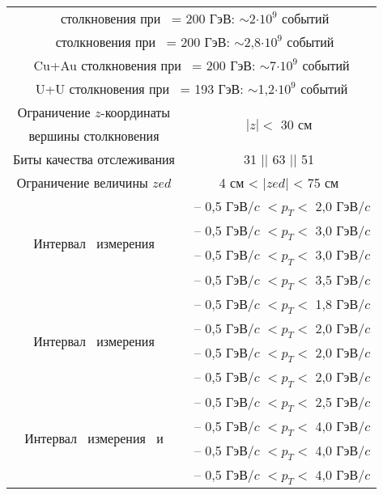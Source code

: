 \begin{table}
{\begin{tabular}{|c|c|}
		\multicolumn{2}{|c|}{\pal \ столкновения при \sqsn \ = 200 ГэВ: $\sim$2$\cdot 10^9$ событий}\\ 
		\multicolumn{2}{|c|}{\heau \ столкновения при \sqsn \ = 200 ГэВ: $\sim$2,8$\cdot 10^9$ событий}\\ 
		\multicolumn{2}{|c|}{Cu+Au столкновения при \sqsn \ = 200 ГэВ: $\sim$7$\cdot 10^9$ событий}\\ 
		\multicolumn{2}{|c|}{U+U столкновения при \sqsn \ = 193 ГэВ: $\sim$1,2$\cdot 10^9$ событий}\\ \hline
		Ограничение $z$-координаты & \multirow{2}{*}{$|z| < $ 30 см} \\ %
		вершины столкновения    &          \\ \hline
		Биты качества отслеживания  &  31 || 63 || 51   \\ \hline
		Ограничение величины $zed$  &  4 см < $|zed|$ < 75 см  \\ \hline
		\multirow{4}{*}{Интервал \pt \ измерения \pipm} & \pal \ -- 0,5 ГэВ/$c$ $< p_T < $ 2,0 ГэВ/$c$ \\
		& \heau \ -- 0,5 ГэВ/$c$ $< p_T < $ 3,0 ГэВ/$c$  \\ 
		& \cuau \ -- 0,5 ГэВ/$c$ $< p_T < $ 3,0 ГэВ/$c$  \\ 
		& \uu \ -- 0,5 ГэВ/$c$ $< p_T < $ 3,5 ГэВ/$c$  \\ \hline
			\multirow{4}{*}{Интервал \pt \ измерения \Kpm} & \pal \ -- 0,5 ГэВ/$c$ $< p_T < $ 1,8 ГэВ/$c$ \\
		& \heau \ -- 0,5 ГэВ/$c$ $< p_T < $ 2,0 ГэВ/$c$  \\ 
		& \cuau \ -- 0,5 ГэВ/$c$ $< p_T < $ 2,0 ГэВ/$c$  \\ 
		& \uu \ -- 0,5 ГэВ/$c$ $< p_T < $ 2,0 ГэВ/$c$  \\ \hline
		\multirow{4}{*}{Интервал \pt  \ измерения \prot \ и \aprot} & \pal \ -- 0,5 ГэВ/$c$ $< p_T < $ 2,5 ГэВ/$c$ \\
		& \heau \ -- 0,5 ГэВ/$c$ $< p_T < $ 4,0 ГэВ/$c$  \\ 
		& \cuau \ -- 0,5 ГэВ/$c$ $< p_T < $ 4,0 ГэВ/$c$  \\ 
		& \uu \ -- 0,5 ГэВ/$c$ $< p_T < $ 4,0 ГэВ/$c$  \\ \hline
			
	\end{tabular}}
	\label{table:cuts}
\end{table}

